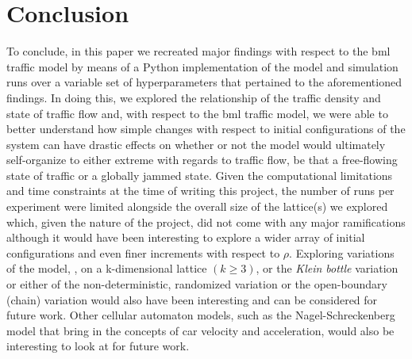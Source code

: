 \section{Conclusion}
\label{sec:Conclusion}
To conclude, in this paper we recreated major findings with respect to the \gls{bml} traffic model by means of a Python implementation of the model and simulation runs over a variable set of hyperparameters that pertained to the aforementioned findings. In doing this, we explored the relationship of the traffic density and state of traffic flow and, with respect to the \gls{bml} traffic model, we were able to better understand how simple changes with respect to initial configurations of the system can have drastic effects on whether or not the model would ultimately self-organize to either extreme with regards to traffic flow, be that a free-flowing state of traffic or a globally jammed state. Given the computational limitations and time constraints at the time of writing this project, the number of runs per experiment were limited alongside the overall size of the lattice(s) we explored which, given the nature of the project, did not come with any major ramifications although it would have been interesting to explore a wider array of initial configurations and even finer increments with respect to $\rho$. Exploring variations of the model,  \ie, on a k-dimensional lattice $(k \geq 3)$, or the \textit{Klein bottle} variation or either of the non-deterministic, randomized variation or the open-boundary (chain) variation would also have been interesting and can be considered for future work. Other cellular automaton models, such as the Nagel-Schreckenberg model that bring in the concepts of car velocity and acceleration, would also be interesting to look at for future work.